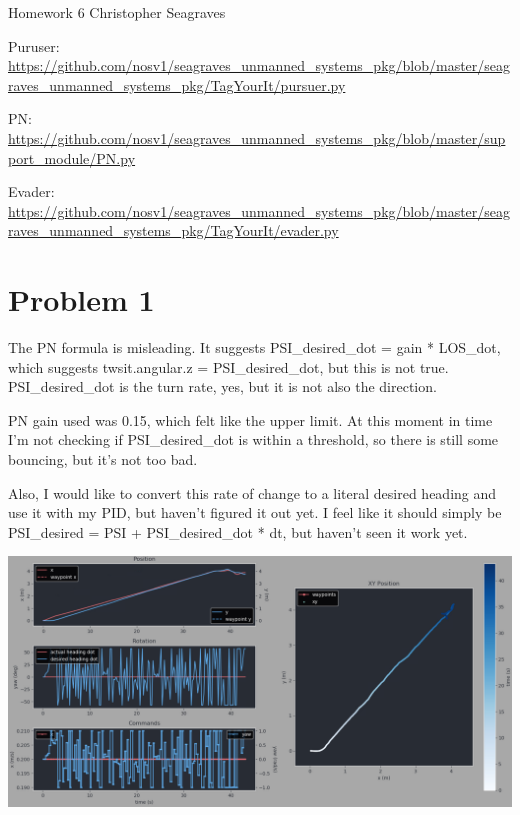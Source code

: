 \documentclass{article}
\begin{document}
    \raggedright
    Homework 6 \break
    Christopher Seagraves \break

    Puruser: \break
    \url{https://github.com/nosv1/seagraves_unmanned_systems_pkg/blob/master/seagraves_unmanned_systems_pkg/TagYourIt/pursuer.py} \break

    PN: \break
    \url{https://github.com/nosv1/seagraves_unmanned_systems_pkg/blob/master/support_module/PN.py} \break

    Evader: \break
    \url{https://github.com/nosv1/seagraves_unmanned_systems_pkg/blob/master/seagraves_unmanned_systems_pkg/TagYourIt/evader.py} \break

    \section*{Problem 1}

    \raggedright
    The PN formula is misleading. It suggests PSI\_desired\_dot = gain * LOS\_dot, which suggests twsit.angular.z = PSI\_desired\_dot, but this is not true. PSI\_desired\_dot is the turn rate, yes, but it is not also the direction. \break

    PN gain used was 0.15, which felt like the upper limit. At this moment in time I'm not checking if PSI\_desired\_dot is within a threshold, so there is still some bouncing, but it's not too bad. \break

    Also, I would like to convert this rate of change to a literal desired heading and use it with my PID, but haven't figured it out yet. I feel like it should simply be PSI\_desired = PSI + PSI\_desired\_dot * dt, but haven't seen it work yet. \break

    \includegraphics[width=\linewidth]{PN_0o15.png}
        
    \newpage
\end{document}
